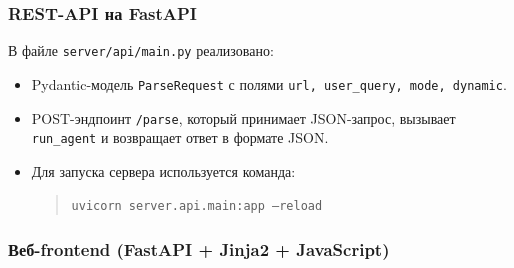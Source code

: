 \subsubsection{REST-API на FastAPI}

В файле \texttt{server/api/main.py} реализовано:
\begin{itemize}
    \item Pydantic-модель \texttt{ParseRequest} с полями \texttt{url, user\_query, mode, dynamic}.
    \item POST-эндпоинт \texttt{/parse}, который принимает JSON-запрос, вызывает \texttt{run\_agent} и возвращает ответ в формате JSON.
    \item Для запуска сервера используется команда:
    \begin{quote}
      \texttt{uvicorn server.api.main:app --reload}
    \end{quote}
\end{itemize}

\subsubsection{Веб-frontend (FastAPI + Jinja2 + JavaScript)}

